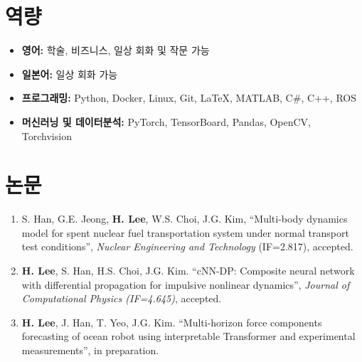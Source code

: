 \documentclass[a4paper,10pt]{extarticle}
\begin{document}
\section*{역량}
\begin{itemize}
    \item \textbf{영어: }학술, 비즈니스, 일상 회화 및 작문 가능
    \item \textbf{일본어: }일상 회화 가능
    \item \textbf{프로그래밍: }Python, Docker, Linux, Git, \LaTeX, MATLAB, C\#, C++, ROS
    \item \textbf{머신러닝 및 데이터분석:} PyTorch, TensorBoard, Pandas, OpenCV, Torchvision
\end{itemize}


\section*{논문}
\noindent
\begin{enumerate}[leftmargin=.5cm]
    \item S. Han, G.E. Jeong, \textbf{H. Lee}, W.S. Choi, J.G. Kim, “Multi-body dynamics model for spent nuclear fuel transportation system under normal transport test conditions”, \textit{Nuclear Engineering and Technology} (IF=2.817), accepted.
    \item \textbf{H. Lee}, S. Han, H.S. Choi, J.G. Kim. “cNN-DP: Composite neural network with differential propagation for impulsive nonlinear dynamics”, \textit{Journal of Computational Physics (IF=4.645)}, accepted.
    \item \textbf{H. Lee}, J. Han, T. Yeo, J.G. Kim. “Multi-horizon force components forecasting of ocean robot using interpretable Transformer and experimental measurements”, in preparation.
\end{enumerate}

\end{document}
